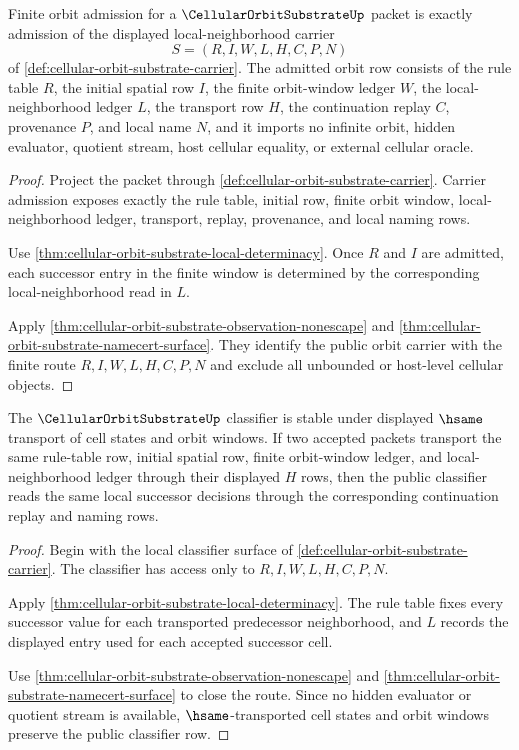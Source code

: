 \begin{theorem}
\label{thm:cellular-orbit-substrate-orbit-carrier-row}
Finite orbit admission for a $\CellularOrbitSubstrateUp$ packet is exactly admission of the displayed local-neighborhood carrier
$$
S=(R,I,W,L,H,C,P,N)
$$
of \autoref{def:cellular-orbit-substrate-carrier}. The admitted orbit row consists of the rule table $R$, the initial spatial row $I$, the finite orbit-window ledger $W$, the local-neighborhood ledger $L$, the transport row $H$, the continuation replay $C$, provenance $P$, and local name $N$, and it imports no infinite orbit, hidden evaluator, quotient stream, host cellular equality, or external cellular oracle.
\end{theorem}
\begin{proof}
Project the packet through \autoref{def:cellular-orbit-substrate-carrier}. Carrier admission exposes exactly the rule table, initial row, finite orbit window, local-neighborhood ledger, transport, replay, provenance, and local naming rows.

Use \autoref{thm:cellular-orbit-substrate-local-determinacy}. Once $R$ and $I$ are admitted, each successor entry in the finite window is determined by the corresponding local-neighborhood read in $L$.

Apply \autoref{thm:cellular-orbit-substrate-observation-nonescape} and \autoref{thm:cellular-orbit-substrate-namecert-surface}. They identify the public orbit carrier with the finite route $R,I,W,L,H,C,P,N$ and exclude all unbounded or host-level cellular objects.
\end{proof}

\begin{theorem}
\label{thm:cellular-orbit-substrate-local-classifier-row}
The $\CellularOrbitSubstrateUp$ classifier is stable under displayed $\hsame$ transport of cell states and orbit windows. If two accepted packets transport the same rule-table row, initial spatial row, finite orbit-window ledger, and local-neighborhood ledger through their displayed $H$ rows, then the public classifier reads the same local successor decisions through the corresponding continuation replay and naming rows.
\end{theorem}
\begin{proof}
Begin with the local classifier surface of \autoref{def:cellular-orbit-substrate-carrier}. The classifier has access only to $R,I,W,L,H,C,P,N$.

Apply \autoref{thm:cellular-orbit-substrate-local-determinacy}. The rule table fixes every successor value for each transported predecessor neighborhood, and $L$ records the displayed entry used for each accepted successor cell.

Use \autoref{thm:cellular-orbit-substrate-observation-nonescape} and \autoref{thm:cellular-orbit-substrate-namecert-surface} to close the route. Since no hidden evaluator or quotient stream is available, $\hsame$-transported cell states and orbit windows preserve the public classifier row.
\end{proof}

